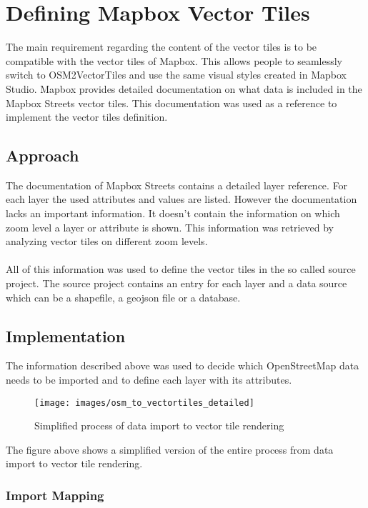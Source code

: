 \chapter{Defining Mapbox Vector Tiles}

The main requirement regarding the content of the vector tiles is to be compatible with the vector tiles of Mapbox. This allows people to seamlessly switch to OSM2VectorTiles and use the same visual styles created in Mapbox Studio. Mapbox provides detailed documentation on what data is included in the Mapbox Streets vector tiles. This documentation was used as a reference to implement the vector tiles definition.

\section{Approach}

The documentation of Mapbox Streets contains a detailed layer reference. For each layer the used attributes and values are listed. However the documentation lacks an important information. It doesn't contain the information on which zoom level a layer or attribute is shown. This information was retrieved by analyzing vector tiles on different zoom levels.\\\\
All of this information was used to define the vector tiles in the so called source project. The source project contains an entry for each layer and a data source which can be a shapefile, a geojson file or a database. 

\section{Implementation}

The information described above was used to decide which OpenStreetMap data needs to be imported and to define each layer with its attributes.

\begin{figure}[H]
\centering
\texttt{[image: images/osm\_to\_vectortiles\_detailed]}
\caption{Simplified process of data import to vector tile rendering}
\end{figure}

The figure above shows a simplified version of the entire process from data import to vector tile rendering. 

\subsection{Import Mapping}

